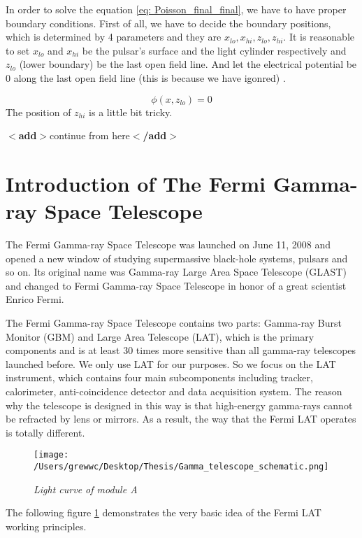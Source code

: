 \documentclass[12pt]{report}
\newcommand{\mycaption}[1]{\caption{\textit{\footnotesize #1}}}
\newcommand{\add}[1]{
  $<$\textbf{add}$>$#1$<$\textbf{/add}$>$
}
\begin{document}
          In order to solve the equation \ref{eq: Poisson_final_final}, we have to have proper boundary conditions. 
          First of all, we have to decide the boundary positions, which is determined by 4 parameters and they are  
          $x_{lo}, x_{hi}, z_{lo}, z_{hi}$. It is reasonable to set $x_{lo}$ and $x_{hi}$
          be the pulsar's surface and the light cylinder respectively and $z_{lo}$ (lower boundary) be the last open 
          field line. And let the electrical potential be $0$ along the last open field line (this is because we have 
          igonred) .   

          \begin{equation}
            \label{eq: lower_boundary}
            \phi \left(x, z_{lo}\right) = 0
          \end{equation}
          The position of $z_{hi}$ is a little bit tricky. 

          \add{continue from here}

        \section{Introduction of The Fermi Gamma-ray Space Telescope}
          The Fermi Gamma-ray Space Telescope was launched on June 11, 2008 and opened a new window of studying
          supermassive black-hole systems, pulsars and so on. Its original name was Gamma-ray Large Area Space 
          Telescope (GLAST) and changed to Fermi Gamma-ray Space Telescope in honor of a great scientist 
          Enrico Fermi. 

          The Fermi Gamma-ray Space Telescope contains two parts: Gamma-ray Burst Monitor (GBM) and Large 
          Area Telescope (LAT), which is the primary components and is at least 30 times more sensitive than 
          all gamma-ray telescopes launched before. We only use LAT for our purposes. So we 
          focus on the LAT instrument, which contains four main subcomponents including tracker, calorimeter,
          anti-coincidence detector and data acquisition system. The reason why the telescope is designed in 
          this way is that high-energy gamma-rays cannot be refracted by lens or mirrors. As a result, the way
          that the Fermi LAT operates is totally different. 

          
        \begin{figure}[!ht]  
          \begin{minipage}{1\textwidth}
            \begin{center} 
                \texttt{[image: /Users/grewwc/Desktop/Thesis/Gamma\_telescope\_schematic.png]}
                \mycaption{Light curve of module A}
                \label{fig:fermi schematic}
            \end{center}
          \end{minipage}
        \end{figure}
        The following figure \ref{fig:fermi schematic} demonstrates the very basic idea of the Fermi LAT working
        principles. \\
\end{document}
